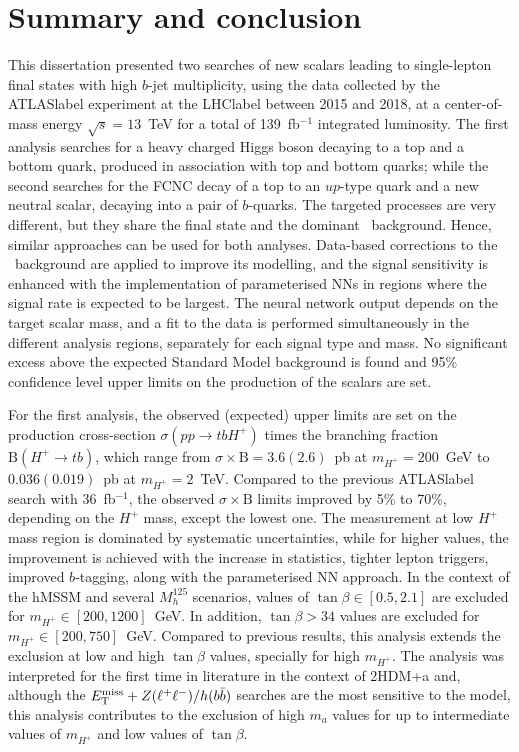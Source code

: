 \chapter{Summary and conclusion}

This dissertation presented two searches of new scalars leading to single-lepton final states with high $b$-jet multiplicity, using the data collected by the \acrshort{ATLASlabel} experiment at the \acrshort{LHClabel} between 2015 and 2018, at a center-of-mass energy $\sqrt{s}=13$~TeV for a total of 139~fb$^{-1}$ integrated luminosity. The first analysis searches for a heavy charged Higgs boson decaying to a top and a bottom quark, produced in association with top and bottom quarks; while the second searches for the FCNC decay of a top to an $up$-type quark and a new neutral scalar, decaying into a pair of $b$-quarks. The targeted processes are very different, but they share the final state and the dominant \ttjets\ background. Hence, similar approaches can be used for both analyses. Data-based corrections to the \ttbar\ background are applied to improve its modelling, and the signal sensitivity is enhanced with the implementation of parameterised NNs in regions where the signal rate is expected to be largest. The neural network output depends on the target scalar mass, and a fit to the data is performed simultaneously in the different analysis regions, separately for each signal type and mass. No significant excess above the expected Standard Model background is found and 95\% confidence level upper limits on the production of the scalars are set.

For the first analysis, the observed (expected) upper limits are set on the production cross-section $\sigma(pp\to tb H^+)$ times the branching fraction $\text{B}(H^+\to tb)$, which range from $\sigma\times\text{B}=3.6(2.6)$~pb at $m_{H^+}=200$~GeV to $0.036(0.019)$~pb at $m_{H^+}=2$~TeV. Compared to the previous \acrshort{ATLASlabel} search with 36~fb$^{-1}$, the observed $\sigma\times\text{B}$ limits improved by 5\% to 70\%, depending on the $H^+$ mass, except the lowest one. The measurement at low $H^+$ mass region is dominated by systematic uncertainties, while for higher values, the improvement is achieved with the increase in statistics, tighter lepton triggers, improved $b$-tagging, along with the parameterised NN approach. In the context of the hMSSM and several $M_{h}^{125}$ scenarios, values of $\tan\beta\in[0.5,2.1]$ are excluded for $m_{H^+}\in[200,1200]$~GeV. In addition, $\tan\beta>34$ values are excluded for $m_{H^+}\in[200,750]$~GeV. Compared to previous results, this analysis extends the exclusion at low and high $\tan\beta$ values, specially for high $m_{H^+}$. The analysis was interpreted for the first time in literature in the context of 2HDM+a and, although the $E_{\text{T}}^{\text{miss}}+Z(\ell^+\ell^-)/h(b\bar{b})$ searches are the most sensitive to the model, this analysis contributes to the exclusion of high $m_a$ values for up to intermediate values of $m_{H^+}$ and low values of $\tan\beta$.

